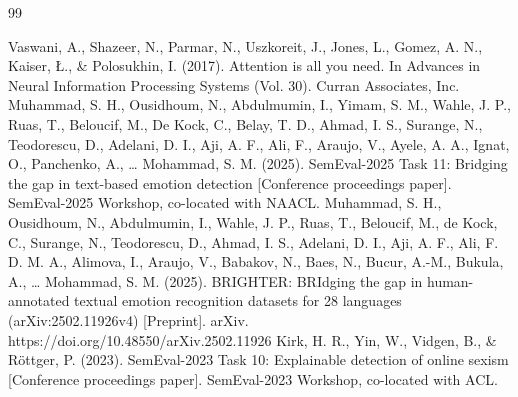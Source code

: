 \documentclass[UTF8, fontset=windows]{ctexart}
\newenvironment{references}{
	\setlength{\parindent}{2em}
	\begin{thebibliography}{99}
	}{
	\end{thebibliography}
}
\begin{document}
	\begin{references}
		 Vaswani, A., Shazeer, N., Parmar, N., Uszkoreit, J., Jones, L., Gomez, A. N., Kaiser, Ł., \& Polosukhin, I. (2017). Attention is all you need. In Advances in Neural Information Processing Systems (Vol. 30). Curran Associates, Inc.
		 Muhammad, S. H., Ousidhoum, N., Abdulmumin, I., Yimam, S. M., Wahle, J. P., Ruas, T., Beloucif, M., De Kock, C., Belay, T. D., Ahmad, I. S., Surange, N., Teodorescu, D., Adelani, D. I., Aji, A. F., Ali, F., Araujo, V., Ayele, A. A., Ignat, O., Panchenko, A., … Mohammad, S. M. (2025). SemEval-2025 Task 11: Bridging the gap in text-based emotion detection [Conference proceedings paper]. SemEval-2025 Workshop, co-located with NAACL.
		 Muhammad, S. H., Ousidhoum, N., Abdulmumin, I., Wahle, J. P., Ruas, T., Beloucif, M., de Kock, C., Surange, N., Teodorescu, D., Ahmad, I. S., Adelani, D. I., Aji, A. F., Ali, F. D. M. A., Alimova, I., Araujo, V., Babakov, N., Baes, N., Bucur, A.-M., Bukula, A., … Mohammad, S. M. (2025). BRIGHTER: BRIdging the gap in human-annotated textual emotion recognition datasets for 28 languages (arXiv:2502.11926v4) [Preprint]. arXiv. https://doi.org/10.48550/arXiv.2502.11926
		 Kirk, H. R., Yin, W., Vidgen, B., \& Röttger, P. (2023). SemEval-2023 Task 10: Explainable detection of online sexism [Conference proceedings paper]. SemEval-2023 Workshop, co-located with ACL.
	\end{references}
	
	\label{LastPage}
	
\end{document}
